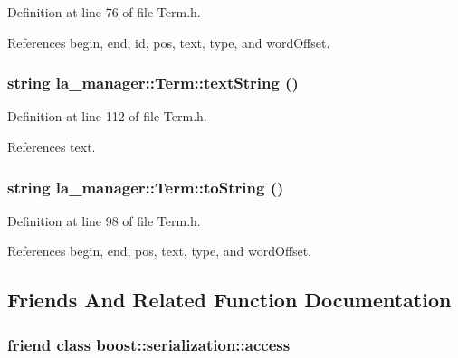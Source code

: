 Definition at line 76 of file Term.h.

References begin, end, id, pos, text, type, and wordOffset.\hypertarget{classla__manager_1_1Term_3b14e0d76b2a6519639a9003ebadb989}{
\subsubsection[{textString}]{\setlength{\rightskip}{0pt plus 5cm}string la\_\-manager::Term::textString ()}}
\label{classla__manager_1_1Term_3b14e0d76b2a6519639a9003ebadb989}




Definition at line 112 of file Term.h.

References text.\hypertarget{classla__manager_1_1Term_8bc20da98085c9587bc868cb3c04dde0}{
\subsubsection[{toString}]{\setlength{\rightskip}{0pt plus 5cm}string la\_\-manager::Term::toString ()}}
\label{classla__manager_1_1Term_8bc20da98085c9587bc868cb3c04dde0}




Definition at line 98 of file Term.h.

References begin, end, pos, text, type, and wordOffset.

\subsection{Friends And Related Function Documentation}
\hypertarget{classla__manager_1_1Term_c98d07dd8f7b70e16ccb9a01abf56b9c}{
\subsubsection[{boost::serialization::access}]{\setlength{\rightskip}{0pt plus 5cm}friend class boost::serialization::access}}
\label{classla__manager_1_1Term_c98d07dd8f7b70e16ccb9a01abf56b9c}




